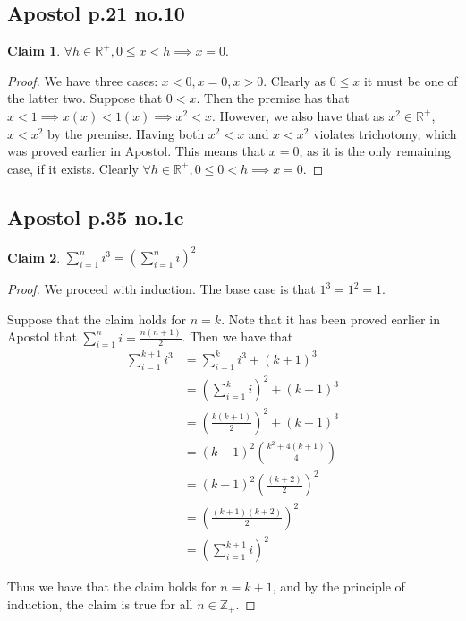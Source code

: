 \documentclass[12pt,letterpaper]{article}
\theoremstyle{definition}
\newtheorem*{claim}{Claim}
\newcommand{\R}{\mathbb{R}}
\newcommand{\Z}{\mathbb{Z}}
\begin{document}
\subsection*{Apostol p.21 no.10}

\begin{claim}
    $\forall h \in \R^+, 0 \leq x < h \implies x = 0$.
\end{claim}

\begin{proof}
    We have three cases: $x < 0, x = 0, x > 0$.
    Clearly as $0 \leq x$ it must be one of the latter two.
    Suppose that $0 < x$.
    Then the premise has that $x < 1 \implies x(x) < 1(x) \implies x^2 < x$.
    However, we also have that as $x^2 \in \R^+$, $x < x^2$ by the premise.
    Having both $x^2 < x$ and $x < x^2$ violates trichotomy, which was proved earlier
    in Apostol. This means that $x = 0$, as it is the only remaining case, if it exists.
    Clearly $\forall h \in \R^+, 0 \leq 0 < h \implies x = 0$.
\end{proof}

\subsection*{Apostol p.35 no.1c}

\begin{claim}
    $\sum_{i=1}^{n} i^3 = (\sum_{i=1}^{n} i)^2$
\end{claim}

\begin{proof}
    We proceed with induction. The base case is that $1^3 = 1^2 = 1$.

    Suppose that the claim holds for $n = k$.
    Note that it has been proved earlier in Apostol that 
    $\sum_{i=1}^{n} i = \frac{n(n+1)}{2}$.
    Then we have that 
    \begin{align*}
        \sum_{i=1}^{k+1} i^3 &= \sum_{i=1}^{k} i^3 + (k+1)^3 \\
        &= (\sum_{i=1}^{k} i)^2 + (k+1)^3 \\
        &= (\frac{k(k+1)}{2})^2 + (k+1)^3 \\
        &= (k+1)^2(\frac{k^2 + 4(k+1)}{4}) \\
        &= (k+1)^2(\frac{(k+2)}{2})^2 \\
        &= (\frac{(k+1)(k+2)}{2})^2 \\
        &= (\sum_{i=1}^{k+1} i)^2
    \end{align*}

    Thus we have that the claim holds for $n = k+1$, and by the principle of induction,
    the claim is true for all $n \in \Z_+$. 
\end{proof}
\end{document}
